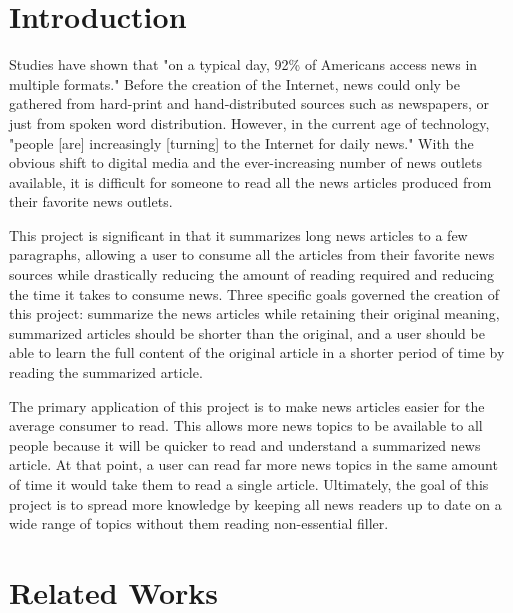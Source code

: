 \documentclass{IEEEtran}
\begin{document}
\maketitle
\IEEEdisplaynontitleabstractindextext


\section{Introduction}
Studies have shown that "on a typical day, 92\% of Americans access news in multiple formats." \cite{news_reading_behavior} Before the creation of the Internet, news could only be gathered from hard-print and hand-distributed sources such as newspapers, or just from spoken word distribution. However, in the current age of technology, "people [are] increasingly [turning] to the Internet for daily news." \cite{news_reading_behavior} With the obvious shift to digital media and the ever-increasing number of news outlets available, it is difficult for someone to read all the news articles produced from their favorite news outlets.

This project is significant in that it summarizes long news articles to a few paragraphs, allowing a user to consume all the articles from their favorite news sources while drastically reducing the amount of reading required and reducing the time it takes to consume news. Three specific goals governed the creation of this project: summarize the news articles while retaining their original meaning, summarized articles should be shorter than the original, and a user should be able to learn the full content of the original article in a shorter period of time by reading the summarized article.

The primary application of this project is to make news articles easier for the average consumer to read. This allows more news topics to be available to all people because it will be quicker to read and understand a summarized news article. At that point, a user can read far more news topics in the same amount of time it would take them to read a single article. Ultimately, the goal of this project is to spread more knowledge by keeping all news readers up to date on a wide range of topics without them reading non-essential filler.

\section{Related Works}
\end{document}
